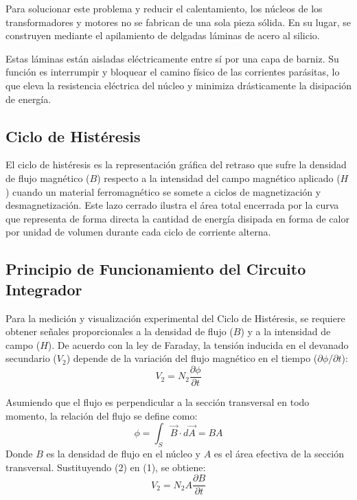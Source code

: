 Para solucionar este problema y reducir el calentamiento, los núcleos de los transformadores y motores no se fabrican de una sola pieza sólida. En su lugar, se construyen mediante el apilamiento de delgadas láminas de acero al silicio.

Estas láminas están aisladas eléctricamente entre sí por una capa de barniz. Su función es interrumpir y bloquear el camino físico de las corrientes parásitas, lo que eleva la resistencia eléctrica del núcleo y minimiza drásticamente la disipación de energía.

\subsection{Ciclo de Histéresis}
El ciclo de histéresis es la representación gráfica del retraso que sufre la densidad de flujo magnético ($B$) respecto a la intensidad del campo magnético aplicado ($H$) cuando un material ferromagnético se somete a ciclos de magnetización y desmagnetización. Este lazo cerrado ilustra el área total encerrada por la curva que representa de forma directa la cantidad de energía disipada en forma de calor por unidad de volumen durante cada ciclo de corriente alterna.


\subsection{ Principio de Funcionamiento del Circuito Integrador}
Para la medición y visualización experimental del Ciclo de Histéresis, se requiere obtener señales proporcionales a la densidad de flujo ($B$) y a la intensidad de campo ($H$). De acuerdo con la ley de Faraday, la tensión inducida en el devanado secundario ($V_2$) depende de la variación del flujo magnético en el tiempo ($\partial \phi / \partial t$):
\begin{equation}
V_2 = N_2 \frac{\partial \phi}{\partial t}
\end{equation}

Asumiendo que el flujo es perpendicular a la sección transversal en todo momento, la relación del flujo se define como:
\begin{equation}
\phi = \int_S \vec{B} \cdot d\vec{A} = BA
\end{equation}
Donde $B$ es la densidad de flujo en el núcleo y $A$ es el área efectiva de la sección transversal. Sustituyendo (2) en (1), se obtiene:
\begin{equation}
V_2 = N_2 A \frac{\partial B}{\partial t}
\end{equation}

